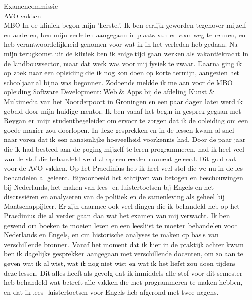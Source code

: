 \documentclass{letter}
\begin{document}
\begin{letter}{Examencommissie \\ AVO-vakken \\ MBO}
In de kliniek begon mijn 'herstel'. Ik ben eerlijk geworden tegenover mijzelf en anderen, ben mijn 
verleden aangegaan in plaats van er voor weg te rennen, en heb verantwoordelijkheid genomen voor 
wat ik in het verleden heb gedaan. Na mijn terugkomst uit de kliniek ben ik enige tijd  gaan werken 
als vakantiekracht in de landbouwsector, maar dat werk was voor mij fysiek te zwaar.
Daarna ging ik op zoek naar een opleiding die ik nog kon doen op korte termijn, aangezien het schooljaar
al bijna was begonnen. Zodoende meldde ik me aan voor de MBO opleiding Software Development: Web \& Apps 
bij de afdeling Kunst \& Multimedia van het Noorderpoort in Groningen en een paar dagen later werd ik gebeld 
door mijn huidige mentor. Ik ben vanaf het begin in gesprek gegaan met Reygan en mijn studentbegeleider 
om ervoor te zorgen dat ik de opleiding om een goede manier zou doorlopen. In deze gesprekken en in de lessen kwam 
al snel naar voren dat ik een aanzienlijke hoeveelheid voorkennis had. Door de paar jaar die ik had besteed aan
de poging mijzelf te leren programmeren, had ik heel veel van de stof die behandeld werd al op een eerder moment 
geleerd. Dit gold ook voor de AVO-vakken. Op het Praedinius heb ik heel veel stof die we nu in de les behandelen
al geleerd. Bijvoorbeeld het schrijven van betogen en beschouwingen bij Nederlands, het maken van lees- en luistertoetsen
bij Engels en het discussiëren en analyseren van de politiek en de samenleving als geheel bij Maatschappijleer.
Er zijn daarmee ook veel dingen die ik behandeld heb op het Praedinius die al verder gaan dan wat het examen
van mij verwacht. Ik ben gewend om boeken te moeten lezen en een leeslijst te moeten behandelen voor Nederlands
en Engels, en om historische analyses te maken op basis van verschillende bronnen. Vanaf het moment dat ik 
hier in de praktijk achter kwam ben ik dagelijks gesprekken aangegaan met verschillende docenten, om zo aan 
te geven wat ik al wist, wat ik nog niet wist en wat ik het liefst zou doen tijdens deze lessen. 
Dit alles heeft als gevolg dat ik inmiddels alle stof voor dit semester heb behandeld wat betreft alle 
vakken die met programmeren te maken hebben, en dat ik lees- luistertoetsen voor Engels heb afgerond met twee 
negens. 


\end{letter}
\end{document}
